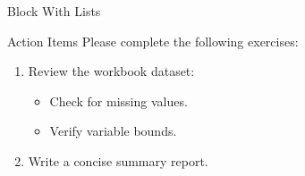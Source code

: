 \documentclass[14pt,t]{beamer}
\begin{document}
\begin{frame}{Block With Lists}
\begin{block}{Action Items}
Please complete the following exercises:
\begin{enumerate}
\item Review the workbook dataset:
  \begin{itemize}
  \item Check for missing values.
  \item Verify variable bounds.
  \end{itemize}
\item Write a concise summary report.
\end{enumerate}
\end{block}
\end{frame}
\end{document}
